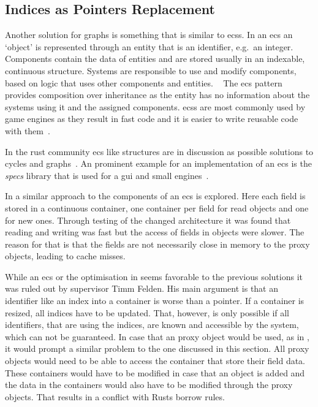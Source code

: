 \documentclass[thesis]{subfiles}
\begin{document}
  \subsection{Indices as Pointers Replacement}
    Another solution for graphs is something that is similar to \glspl{ecs}.
    In an \gls{ecs} an `object' is represented through an entity that is an identifier, e.g.~an integer.
    Components contain the data of entities and are stored usually in an indexable, continuous structure.
    Systems are responsible to use and modify components, based on logic that uses other components and entities.%
    ~\autocite[209]{sfml}
    The \gls{ecs} pattern provides composition over inheritance as the entity has no information about the systems using it and the assigned components.
    \glspl{ecs} are most commonly used by game engines as they result in fast code and it is easier to write reusable code with them~\autocites[209]{sfml}{ecs-acc-game}{ecs-hash}.

    In the rust community \gls{ecs} like structures are in discussion as possible solutions to cycles and graphs~\autocites{rust-graph-r4cpp}{rust-graph-leipzig}{rust-graph-niko}{rust-graph-exyr}.
    An prominent example for an implementation of an \gls{ecs} is the \emph{specs}\autocite{rust-specs} library that is used for a \gls{gui}\autocite{rust-xi} and small engines~\autocites{rust-amethyst}{rust-rhusics}.

    In \autocite{skill-scala} a similar approach to the components of an \gls{ecs} is explored.
    Here each field is stored in a continuous container, one container per field for read objects and one for new ones.
    Through testing of the changed architecture it was found that reading and writing was fast but the access of fields in objects were slower.
    The reason for that is that the fields are not necessarily close in memory to the proxy objects, leading to cache misses.%
    ~\autocite{skill-scala}

    While an \gls{ecs} or the optimisation in \autocite{skill-scala} seems favorable to the previous solutions it was ruled out by supervisor Timm Felden.
    His main argument is that an identifier like an index into a container is worse than a pointer.
    If a container is resized, all indices have to be updated.
    That, however, is only possible if all identifiers, that are using the indices, are known and accessible by the system, which can not be guaranteed.
    In case that an proxy object would be used, as in \autocite{skill-scala}, it would prompt a similar problem to the one discussed in this section.
    All proxy objects would need to be able to access the container that store their field data.
    These containers would have to be modified in case that an object is added and the data in the containers would also have to be modified through the proxy objects.
    That results in a conflict with Rusts borrow rules.
\end{document}
